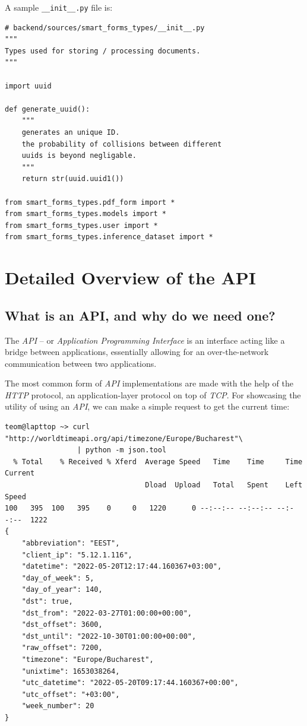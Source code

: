 \documentclass[12pt, a4paper]{report}
\def\code#1{\texttt{#1}}
\begin{document}
A sample \code{\_\_init\_\_.py} file is:

\begin{verbatim}
# backend/sources/smart_forms_types/__init__.py
"""
Types used for storing / processing documents.
"""

import uuid

def generate_uuid():
    """
    generates an unique ID.
    the probability of collisions between different
    uuids is beyond negligable.
    """
    return str(uuid.uuid1())

from smart_forms_types.pdf_form import *
from smart_forms_types.models import *
from smart_forms_types.user import *
from smart_forms_types.inference_dataset import *
\end{verbatim}

\chapter{Detailed Overview of the API}

\section{What is an API, and why do we need one?}

The \textit{API} -- or \textit{Application Programming Interface} is an interface acting like a bridge between applications, essentially allowing for an over-the-network communication between two applications.

The most common form of \textit{API} implementations are made with the help of the \textit{HTTP} protocol, an application-layer protocol on top of \textit{TCP}. For showcasing the utility of using an \textit{API}, we can make a simple request to get the current time:

\begin{verbatim}
teom@lapttop ~> curl "http://worldtimeapi.org/api/timezone/Europe/Bucharest"\
                 | python -m json.tool
  % Total    % Received % Xferd  Average Speed   Time    Time     Time  Current
                                 Dload  Upload   Total   Spent    Left  Speed
100   395  100   395    0     0   1220      0 --:--:-- --:--:-- --:--:--  1222
{
    "abbreviation": "EEST",
    "client_ip": "5.12.1.116",
    "datetime": "2022-05-20T12:17:44.160367+03:00",
    "day_of_week": 5,
    "day_of_year": 140,
    "dst": true,
    "dst_from": "2022-03-27T01:00:00+00:00",
    "dst_offset": 3600,
    "dst_until": "2022-10-30T01:00:00+00:00",
    "raw_offset": 7200,
    "timezone": "Europe/Bucharest",
    "unixtime": 1653038264,
    "utc_datetime": "2022-05-20T09:17:44.160367+00:00",
    "utc_offset": "+03:00",
    "week_number": 20
}
\end{verbatim}
\end{document}
